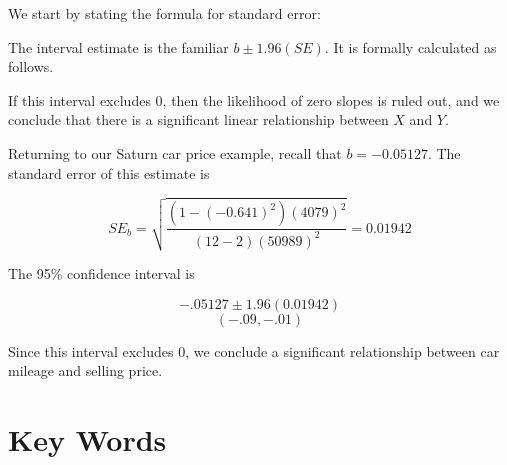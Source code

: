 \documentclass[11pt]{book}\usepackage[]{graphicx}\usepackage[]{color}
\begin{document}
We start by stating the formula for standard error:


The interval estimate is the familiar $b \pm 1.96(SE)$.  It is formally calculated as follows.


If this interval excludes 0, then the likelihood of zero slopes is ruled out, and we conclude that there is a significant linear relationship between $X$ and $Y$.

Returning to our Saturn car price example, recall that $b = -0.05127$.  The standard error of this estimate is

\begin{equation*}
  SE_b = \sqrt{ \frac{(1 - (-0.641)^2) (4079)^2}{(12 - 2) (50989)^2}} = 0.01942 
\end{equation*}  

The 95\% confidence interval is 

\begin{equation*}
  -.05127 \pm 1.96 (0.01942) 
\end{equation*}  
\begin{equation*}
  (-.09,  -.01) 
\end{equation*}

Since this interval excludes 0, we conclude a significant relationship between car mileage and selling price.

\section{Key Words}
\end{document}
